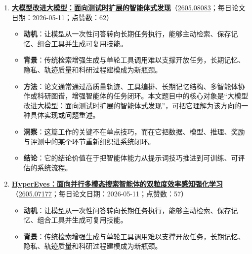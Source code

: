 \begin{enumerate}[leftmargin=1.5em]
\begin{itemize}[leftmargin=1.5em]
    \item \textbf{背景}：传统检索增强生成与单轮工具调用难以支撑开放任务，长期记忆、隐私、轨迹质量和科研过程建模成为新瓶颈。
    \item \textbf{方法}：论文通常通过高质量轨迹、工具编排、长期记忆结构、多智能体协作或科研图谱，增强智能体的任务闭环。本文题目中的核心对象是“几何冲突：解释并控制大模型持续后训练中的遗忘”，可把它理解为该方向的一种具体实现或问题重述。
    \item \textbf{洞察}：这篇工作的关键不在单点技巧，而在它把数据、模型、推理、奖励与评测中的某个环节重新组织进系统闭环。
    \item \textbf{结论}：它的结论价值在于把智能体能力从提示词技巧推进到可训练、可评估的系统流程。
  \end{itemize}
  \item \textbf{\href{https://huggingface.co/papers/2605.08083}{大模型改进大模型：面向测试时扩展的智能体式发现}}（\href{https://arxiv.org/abs/2605.08083}{2605.08083}；每日论文日期：2026-05-11；点赞数：62）
  \begin{itemize}[leftmargin=1.5em]
    \item \textbf{动机}：让模型从一次性问答转向长期任务执行，能够主动检索、保存记忆、组合工具并生成可复用技能。
    \item \textbf{背景}：传统检索增强生成与单轮工具调用难以支撑开放任务，长期记忆、隐私、轨迹质量和科研过程建模成为新瓶颈。
    \item \textbf{方法}：论文通常通过高质量轨迹、工具编排、长期记忆结构、多智能体协作或科研图谱，增强智能体的任务闭环。本文题目中的核心对象是“大模型改进大模型：面向测试时扩展的智能体式发现”，可把它理解为该方向的一种具体实现或问题重述。
    \item \textbf{洞察}：这篇工作的关键不在单点技巧，而在它把数据、模型、推理、奖励与评测中的某个环节重新组织进系统闭环。
    \item \textbf{结论}：它的结论价值在于把智能体能力从提示词技巧推进到可训练、可评估的系统流程。
  \end{itemize}
  \item \textbf{\href{https://huggingface.co/papers/2605.07177}{HyperEyes：面向并行多模态搜索智能体的双粒度效率感知强化学习}}（\href{https://arxiv.org/abs/2605.07177}{2605.07177}；每日论文日期：2026-05-11；点赞数：57）
  \begin{itemize}[leftmargin=1.5em]
    \item \textbf{动机}：让模型从一次性问答转向长期任务执行，能够主动检索、保存记忆、组合工具并生成可复用技能。
    \item \textbf{背景}：传统检索增强生成与单轮工具调用难以支撑开放任务，长期记忆、隐私、轨迹质量和科研过程建模成为新瓶颈。

\end{itemize}
\end{enumerate}
